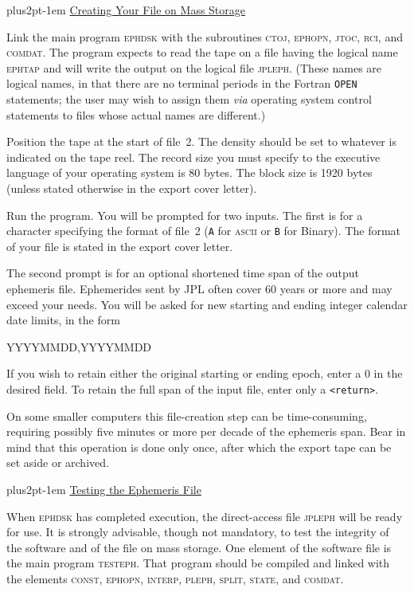 \documentclass[twoside,11pt,nolof]{starlink}
\providecommand{\hdg}[1]{\vskip4pt plus2pt\leavevmode\kern-1em \underline{\large{#1}}\par}
\begin{document}

\hdg{Creating Your File on Mass Storage}

Link the main program \textsc{ephdsk} with the subroutines \textsc{ctoj, ephopn,
jtoc, rci}, and \textsc{comdat}. The program expects to read the tape on a
file having the logical name \textsc{ephtap} and will write the output on the
logical file \textsc{jpleph}. (These names are logical names, in that there
are no terminal periods in the Fortran \texttt{OPEN} statements; the user
may wish to assign them \emph{via} operating system control
statements to files whose actual names are different.)

Position the tape at the start of file~2.
The density should be set to whatever is indicated
on the tape reel. The record size you must specify to the
executive language of your operating system is 80 bytes. The
block size is 1920 bytes (unless stated otherwise in the export
cover letter).

Run the program.  You will be prompted for two inputs.  The first is for
a character specifying the format of file~2 (\texttt{A} for \textsc{ascii}
or \texttt{B} for Binary). The format of your file is stated in the export
cover letter.

The second prompt is for an optional shortened time span of the output
ephemeris file. Ephemerides sent by JPL often cover 60 years or more and
may exceed your needs.  You will be asked for new starting and ending
integer calendar date limits, in the form

\begin{terminalv}
        YYYYMMDD,YYYYMMDD
\end{terminalv}

If you wish to retain either the original starting or ending epoch,
enter a 0 in the desired field. To retain the full span
of the input file, enter only a \texttt{<return>}.

On some smaller computers this file-creation
step can be time-consuming, requiring possibly five minutes or
more per decade of the ephemeris span. Bear in mind that this
operation is done only once, after which the export tape
can be set aside or archived.

\hdg{Testing the Ephemeris File}

When \textsc{ephdsk} has completed execution, the direct-access file
\textsc{jpleph} will be ready for use. It is strongly advisable, though
not mandatory, to test the integrity of the software
and of the file on mass storage.
One element of the software file is the main program \textsc{testeph}.
That program should be compiled and linked with the elements
\textsc{const, ephopn, interp, pleph, split, state}, and \textsc{comdat}.
\end{document}
